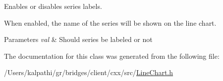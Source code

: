 Enables or disables series labels. 

When enabled, the name of the series will be shown on the line chart.


\begin{DoxyParams}{Parameters}
{\em val} & Should series be labeled or not \\
\hline
\end{DoxyParams}


The documentation for this class was generated from the following file\+:\begin{DoxyCompactItemize}
\item 
/\+Users/kalpathi/gr/bridges/client/cxx/src/\mbox{\hyperlink{_line_chart_8h}{Line\+Chart.\+h}}\end{DoxyCompactItemize}

